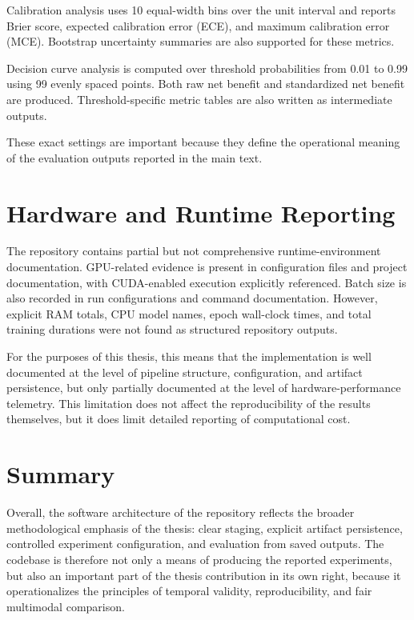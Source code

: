Calibration analysis uses 10 equal-width bins over the unit interval and reports Brier score, expected calibration error (ECE), and maximum calibration error (MCE). Bootstrap uncertainty summaries are also supported for these metrics.

Decision curve analysis is computed over threshold probabilities from 0.01 to 0.99 using 99 evenly spaced points. Both raw net benefit and standardized net benefit are produced. Threshold-specific metric tables are also written as intermediate outputs.

These exact settings are important because they define the operational meaning of the evaluation outputs reported in the main text.

\section{Hardware and Runtime Reporting}

The repository contains partial but not comprehensive runtime-environment documentation. GPU-related evidence is present in configuration files and project documentation, with CUDA-enabled execution explicitly referenced. Batch size is also recorded in run configurations and command documentation. However, explicit RAM totals, CPU model names, epoch wall-clock times, and total training durations were not found as structured repository outputs.

For the purposes of this thesis, this means that the implementation is well documented at the level of pipeline structure, configuration, and artifact persistence, but only partially documented at the level of hardware-performance telemetry. This limitation does not affect the reproducibility of the results themselves, but it does limit detailed reporting of computational cost.

\section{Summary}

Overall, the software architecture of the repository reflects the broader methodological emphasis of the thesis: clear staging, explicit artifact persistence, controlled experiment configuration, and evaluation from saved outputs. The codebase is therefore not only a means of producing the reported experiments, but also an important part of the thesis contribution in its own right, because it operationalizes the principles of temporal validity, reproducibility, and fair multimodal comparison.